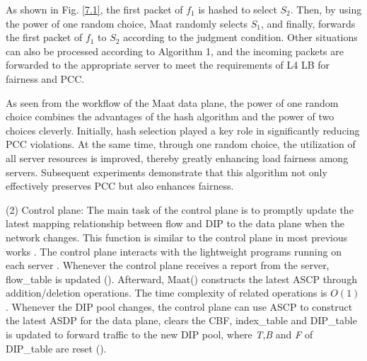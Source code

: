 {As shown in Fig. \ref{7.1}, the first packet of $f_1$ is hashed to select \emph{$S_2$}. Then, by using the power of one random choice, Maat randomly selects \emph{$S_1$}, and finally, forwards the first packet of $f_1$ to \emph{$S_2$} according to the judgment condition. Other situations can also be processed according to Algorithm 1, and the incoming packets are forwarded to the appropriate server to meet the requirements of L4 LB for fairness and PCC.

As seen from the workflow of the Maat data plane, the power of one random choice combines the advantages of the hash algorithm and the power of two choices cleverly. Initially, hash selection played a key role in significantly reducing PCC violations. At the same time, through one random choice, the utilization of all server resources is improved, thereby greatly enhancing load fairness among servers. Subsequent experiments demonstrate that this algorithm not only effectively preserves PCC but also enhances fairness.

(2) Control plane: The main task of the control plane is to promptly update the latest mapping relationship between flow and DIP to the data plane when the network changes. This function is similar to the control plane in most previous works \cite{miao2017silkroad, eisenbud2016maglev, zhang2021loom}.  The control plane interacts with the lightweight programs running on each server \cite{gandhi2014duet}. Whenever the control plane receives a report from the server, flow_table is updated (). Afterward, Maat() constructs the latest ASCP through addition/deletion operations. The time complexity of related operations is \emph{$O(1)$} \cite{yu2018memory}. Whenever the DIP pool changes, the control plane can use ASCP to construct the latest ASDP for the data plane, clears the CBF, index\_table and DIP\_table is updated to forward traffic to the new DIP pool, where \emph{T},\emph{B} and \emph{F} of DIP_table are reset ().


}
